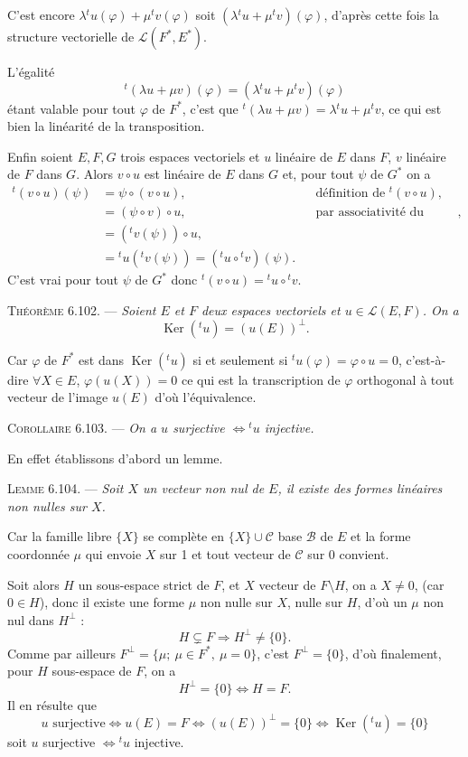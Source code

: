 C'est encore $\lambda{}^tu(\varphi)+\mu{}^tv(\varphi)$ soit $(\lambda{}^tu+\mu{}^tv)(\varphi)$, d'après cette fois la structure vectorielle de $\mathcal L(F^*,E^*)$.

L'égalité
\[
{}^t(\lambda u+\mu v)(\varphi)=(\lambda{}^tu+\mu{}^tv)(\varphi)
\]
étant valable pour tout $\varphi$ de $F^*$, c'est que ${}^t(\lambda u+\mu v)=\lambda{}^tu+\mu{}^tv$, ce qui est bien la linéarité de la transposition.

Enfin soient $E,F,G$ trois espaces vectoriels et $u$ linéaire de $E$ dans $F$, $v$ linéaire de $F$ dans $G$. Alors $v\circ u$ est linéaire de $E$ dans $G$ et, pour tout $\psi$ de $G^*$ on a
\[
\begin{aligned}
{}^t(v\circ u)(\psi)&=\psi\circ(v\circ u), &&\text{définition de }{}^t(v\circ u),\\
&=(\psi\circ v)\circ u, &&\text{par associativité du produit de composition},\\
&=({}^tv(\psi))\circ u,\\
&={}^tu({}^tv(\psi))=({}^tu\circ{}^tv)(\psi).
\end{aligned}
\]
C'est vrai pour tout $\psi$ de $G^*$ donc ${}^t(v\circ u)={}^tu\circ{}^tv$. \bookend

\medskip\noindent\textsc{Théorème 6.102.} --- \emph{Soient $E$ et $F$ deux espaces vectoriels et $u\in\mathcal L(E,F)$. On a
\[
\operatorname{Ker}({}^tu)=(u(E))^\perp.
\]}

Car $\varphi$ de $F^*$ est dans $\operatorname{Ker}({}^tu)$ si et seulement si ${}^tu(\varphi)=\varphi\circ u=0$, c'est-à-dire $\forall X\in E$, $\varphi(u(X))=0$ ce qui est la transcription de $\varphi$ orthogonal à tout vecteur de l'image $u(E)$ d'où l'équivalence. \bookend

\medskip\noindent\textsc{Corollaire 6.103.} --- \emph{On a $u$ surjective $\Longleftrightarrow {}^tu$ injective.}

En effet établissons d'abord un lemme.

\medskip\noindent\textsc{Lemme 6.104.} --- \emph{Soit $X$ un vecteur non nul de $E$, il existe des formes linéaires non nulles sur $X$.}

Car la famille libre $\{X\}$ se complète en $\{X\}\cup\mathcal C$ base $\mathcal B$ de $E$ et la forme coordonnée $\mu$ qui envoie $X$ sur 1 et tout vecteur de $\mathcal C$ sur 0 convient. \bookend

Soit alors $H$ un sous-espace strict de $F$, et $X$ vecteur de $F\setminus H$, on a $X\ne0$, (car $0\in H$), donc il existe une forme $\mu$ non nulle sur $X$, nulle sur $H$, d'où un $\mu$ non nul dans $H^\perp$ :
\[
H\subsetneq F\Longrightarrow H^\perp\ne\{0\}.
\]
Comme par ailleurs $F^\perp=\{\mu;\ \mu\in F^*,\ \mu=0\}$, c'est $F^\perp=\{0\}$, d'où finalement, pour $H$ sous-espace de $F$, on a
\[
H^\perp=\{0\}\Longleftrightarrow H=F.
\]
Il en résulte que
\[
u\text{ surjective}\Longleftrightarrow u(E)=F\Longleftrightarrow(u(E))^\perp=\{0\}
\Longleftrightarrow\operatorname{Ker}({}^tu)=\{0\}
\]
soit $u$ surjective $\Longleftrightarrow{}^tu$ injective. \bookend

